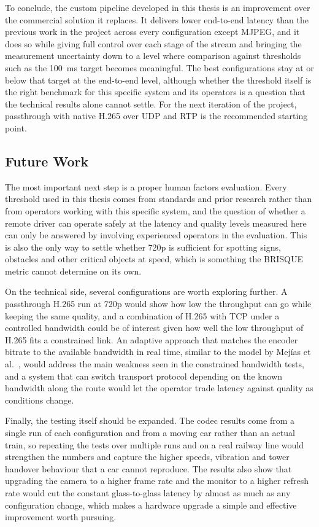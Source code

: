To conclude, the custom pipeline developed in this thesis is an improvement over the commercial solution it replaces. It delivers lower end-to-end latency than the previous work in the project across every configuration except MJPEG, and it does so while giving full control over each stage of the stream and bringing the measurement uncertainty down to a level where comparison against thresholds such as the 100~ms target becomes meaningful. The best configurations stay at or below that target at the end-to-end level, although whether the threshold itself is the right benchmark for this specific system and its operators is a question that the technical results alone cannot settle. For the next iteration of the project, passthrough with native H.265 over UDP and RTP is the recommended starting point.

\subsection{Future Work}

The most important next step is a proper human factors evaluation. Every threshold used in this thesis comes from standards and prior research rather than from operators working with this specific system, and the question of whether a remote driver can operate safely at the latency and quality levels measured here can only be answered by involving experienced operators in the evaluation. This is also the only way to settle whether 720p is sufficient for spotting signs, obstacles and other critical objects at speed, which is something the BRISQUE metric cannot determine on its own.

On the technical side, several configurations are worth exploring further. A passthrough H.265 run at 720p would show how low the throughput can go while keeping the same quality, and a combination of H.265 with TCP under a controlled bandwidth could be of interest given how well the low throughput of H.265 fits a constrained link. An adaptive approach that matches the encoder bitrate to the available bandwidth in real time, similar to the model by Mejías et al.~\cite{mejias2024}, would address the main weakness seen in the constrained bandwidth tests, and a system that can switch transport protocol depending on the known bandwidth along the route would let the operator trade latency against quality as conditions change.

Finally, the testing itself should be expanded. The codec results come from a single run of each configuration and from a moving car rather than an actual train, so repeating the tests over multiple runs and on a real railway line would strengthen the numbers and capture the higher speeds, vibration and tower handover behaviour that a car cannot reproduce. The results also show that upgrading the camera to a higher frame rate and the monitor to a higher refresh rate would cut the constant glass-to-glass latency by almost as much as any configuration change, which makes a hardware upgrade a simple and effective improvement worth pursuing.